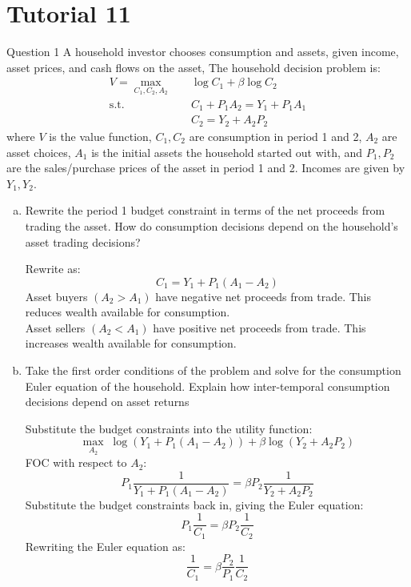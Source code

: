 \documentclass[a4paper]{article}
\newif\IfInSansMode
\begin{document}
\section{Tutorial 11}
	\begin{questionbox}{Question 1}
		A household investor chooses consumption and assets, given income, asset prices, and cash ﬂows on the asset, The household decision problem is:
		\begin{align*}
			V = \max_{C_1,C_2,A_2} \quad &\log C_1 + \beta\log C_2\\
			\text{s.t.}\quad &C_1 + P_1 A_2= Y_1 + P_1 A_1\\
			&C_2 = Y_2 + A_2 P_2
		\end{align*}
		where \( V \) is the value function, \( C_1,C_2 \) are consumption in period 1 and 2, \( A_2 \) are asset choices, \( A_1 \) is the initial assets the household started out with, and \( P_1,P_2 \) are the sales/purchase prices of the asset in period 1 and 2. Incomes are given by \( Y_1,Y_2 \).
		\begin{enumerate}[(a)]
			\item Rewrite the period 1 budget constraint in terms of the net proceeds from trading the asset. How do consumption decisions depend on the household's asset trading decisions?
			\begin{explanationbox}
				Rewrite as:
				\[
					C_1 = Y_1 + P_1 (A_1 - A_2)
				\]
				Asset buyers \( (A_2 > A_1) \) have negative net proceeds from trade. This reduces wealth available for consumption.\\
				Asset sellers \( (A_2 < A_1) \) have positive net proceeds from trade. This increases wealth available for consumption.
			\end{explanationbox}
			\item Take the ﬁrst order conditions of the problem and solve for the consumption Euler equation of the household. Explain how inter-temporal consumption decisions depend on asset returns
			\begin{explanationbox}
				Substitute the budget constraints into the utility function:
				\[
					\max_{A_2}\;\log(Y_1 + P_1 (A_1 - A_2)) + \beta\log (Y_2 + A_2 P_2)
				\]
				FOC with respect to \( A_2 \):
				\[
					P_1\frac{1}{Y_1 + P_1 (A_1 - A_2)} = \beta P_2\frac{1}{Y_2 + A_2 P_2}
				\]
				Substitute the budget constraints back in, giving the Euler equation:
				\[
					P_1\frac{1}{C_1} = \beta P_2\frac{1}{C_2}
				\]
				Rewriting the Euler equation as:
				\[
					\frac{1}{C_1} = \beta \frac{P_2}{P_1}\frac{1}{C_2}
\]
\end{explanationbox}
\end{enumerate}
\end{questionbox}
\end{document}
